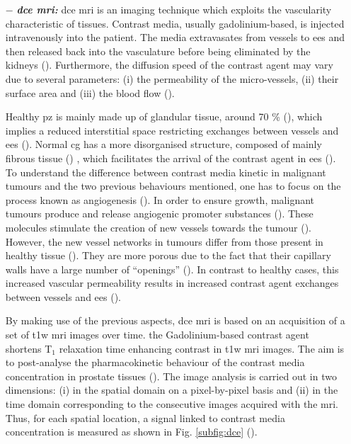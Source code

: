 \begin{enumerate}[leftmargin=*]
\item[$-$] \textbf{\textit{\ac{dce} \ac{mri}:}} \ac{dce} \ac{mri} is an imaging technique which exploits the vascularity characteristic of tissues. Contrast media, usually gadolinium-based, is injected intravenously into the patient. The media extravasates from vessels to \ac{ees} and then released back into the vasculature before being eliminated by the kidneys (\cite{Gribbestad2005}). Furthermore, the diffusion speed of the contrast agent may vary due to several parameters: (i) the permeability of the micro-vessels, (ii) their surface area and (iii) the blood flow (\cite{Padhani2002}).

Healthy \ac{pz} is mainly made up of glandular tissue, around 70 \% (\cite{Choi2007}), which implies a reduced interstitial space restricting exchanges between vessels and \ac{ees} (\cite{Buckley2004,Niekerk2009}). Normal \ac{cg} has a more disorganised structure, composed of mainly fibrous tissue (\cite{Choi2007,Hoeks2011}) , which facilitates the arrival of the contrast agent in \ac{ees} (\cite{Niekerk2013}). To understand the difference between contrast media kinetic in malignant tumours and the two previous behaviours mentioned, one has to focus on the process known as angiogenesis (\cite{Carmeliet2000}). In order to ensure growth, malignant tumours produce and release angiogenic promoter substances (\cite{Carmeliet2000}). These molecules stimulate the creation of new vessels towards the tumour (\cite{Carmeliet2000}). However, the new vessel networks in tumours differ from those present in healthy tissue (\cite{Gribbestad2005}). They are more porous due to the fact that their capillary walls have a large number of ``openings'' (\cite{Gribbestad2005,Choi2007}). In contrast to healthy cases, this increased vascular permeability results in increased contrast agent exchanges between vessels and \ac{ees} (\cite{Verma2012}).

By making use of the previous aspects, \ac{dce} \ac{mri} is based on an acquisition of a set of \ac{t1w} \ac{mri} images over time. the Gadolinium-based contrast agent shortens T$_1$ relaxation time enhancing contrast in \ac{t1w} \ac{mri} images. The aim is to post-analyse the pharmacokinetic behaviour of the contrast media concentration in prostate tissues (\cite{Verma2012}). The image analysis is carried out in two dimensions: (i) in the spatial domain on a pixel-by-pixel basis and (ii) in the time domain corresponding to the consecutive images acquired with the \ac{mri}. Thus, for each spatial location, a signal linked to contrast media concentration is measured as shown in Fig. \ref{subfig:dce} (\cite{Tofts2010}). 


\end{enumerate}
